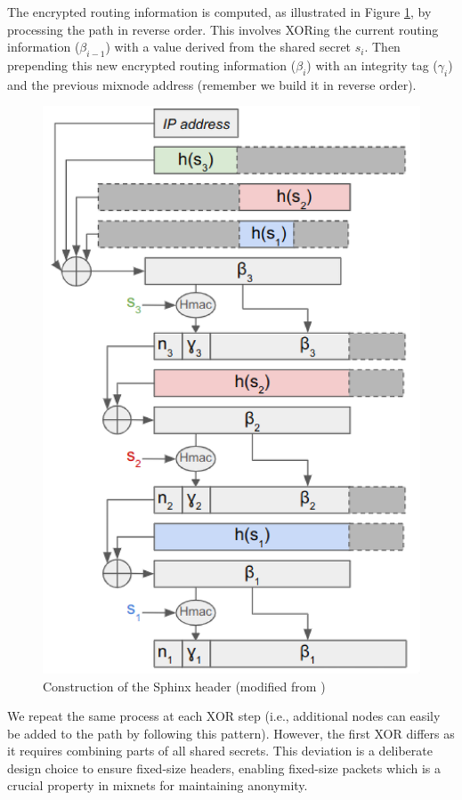 The encrypted routing information is computed, as illustrated in Figure \ref{fig:header_cipher}, by processing the path in reverse order. This involves XORing the current routing information ($\beta_{i-1}$) with a value derived from the shared secret $s_i$. Then prepending this new encrypted routing information ($\beta_i$) with an integrity tag ($\gamma_i$) and the previous mixnode address (remember we build it in reverse order).

\begin{figure}[H]
    \centering
    \includegraphics[width=0.5\linewidth]{Images/header_cipher.png}
    \caption{Construction of the Sphinx header (modified from \cite{sphinx})}
    \label{fig:header_cipher}
\end{figure}

We repeat the same process at each XOR step (i.e., additional nodes can easily be added to the path by following this pattern). However, the first XOR differs as it requires combining parts of all shared secrets. This deviation is a deliberate design choice to ensure fixed-size headers, enabling fixed-size packets which is a crucial property in mixnets for maintaining anonymity.



